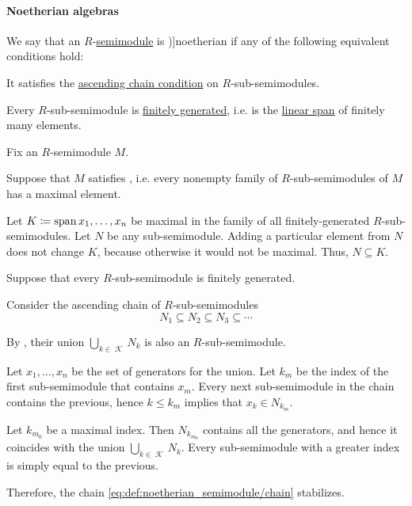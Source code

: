 \paragraph{Noetherian algebras}

\begin{definition}\label{def:noetherian_semimodule}
  We say that an \( R \)-\hyperref[def:semimodule]{semimodule} is \term[bg=ньотеров (\cite[41]{КоцевСидеров2016})]{noetherian} if any of the following equivalent conditions hold:
  \begin{thmenum}
     It satisfies the \hyperref[def:chain_condition]{ascending chain condition} on \( R \)-sub-semimodules.

     Every \( R \)-sub-semimodule is \hyperref[def:module_presentation]{finitely generated}, i.e. is the \hyperref[def:semimodule/submodel]{linear span} of finitely many elements.
  \end{thmenum}
\end{definition}
\begin{defproof}
  Fix an \( R \)-semimodule \( M \).

   Suppose that \( M \) satisfies , i.e. every nonempty family of \( R \)-sub-semimodules of \( M \) has a maximal element.

  Let \( K \coloneqq \operatorname{span}{ x_1, \ldots, x_n } \) be maximal in the family of all finitely-generated \( R \)-sub-semimodules. Let \( N \) be any sub-semimodule. Adding a particular element from \( N \) does not change \( K \), because otherwise it would not be maximal. Thus, \( N \subseteq K \).

   Suppose that every \( R \)-sub-semimodule is finitely generated.

  Consider the ascending chain of \( R \)-sub-semimodules
  \begin{equation}\label{eq:def:noetherian_semimodule/chain}
    N_1 \subseteq N_2 \subseteq N_3 \subseteq \cdots
  \end{equation}

  By , their union \( \bigcup_{k \in \mscrK} N_k \) is also an \( R \)-sub-semimodule.

  Let \( x_1, \ldots, x_n \) be the set of generators for the union. Let \( k_m \) be the index of the first sub-semimodule that contains \( x_m \). Every next sub-semimodule in the chain contains the previous, hence \( k \leq k_m \) implies that \( x_k \in N_{k_m} \).

  Let \( k_{m_0} \) be a maximal index. Then \( N_{k_{m_0}} \) contains all the generators, and hence it coincides with the union \( \bigcup_{k \in \mscrK} N_k \). Every sub-semimodule with a greater index is simply equal to the previous.

  Therefore, the chain \eqref{eq:def:noetherian_semimodule/chain} stabilizes.
\end{defproof}

